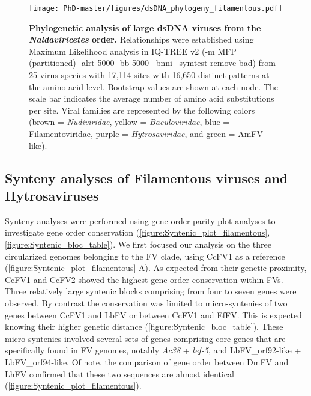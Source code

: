  \begin{figure}[H]
\texttt{[image: PhD-master/figures/dsDNA\_phylogeny\_filamentous.pdf]}\centering
\caption[Paper2:\textit{Naldaviricetes} phylogenetic tree]{\textbf{Phylogenetic analysis of large dsDNA viruses from the \textit{Naldaviricetes} order.} Relationships were established using Maximum Likelihood analysis in IQ-TREE v2 \citep{minh_iq-tree_2020} (-m MFP (partitioned) -alrt 5000 -bb 5000 –bnni –symtest-remove-bad) from 25 virus species with 17,114 sites with 16,650 distinct patterns at the amino-acid level. Bootstrap values are shown at each node. The scale bar indicates the average number of amino acid substitutions per site. Viral families are represented by the following colors (brown = \textit{Nudiviridae}, yellow = \textit{Baculoviridae}, blue = Filamentoviridae, purple = \textit{Hytrosaviridae}, and green = AmFV-like).}
\label{figure:dsDNA_phylogeny_filamentous}
\end{figure}


\subsection{Synteny analyses of Filamentous viruses and Hytrosaviruses}

Synteny analyses were performed using gene order parity plot analyses to investigate gene order conservation (\figurename{\ref{figure:Syntenic_plot_filamentous}}, \figurename{\ref{figure:Syntenic_bloc_table}}). We first focused our analysis on the three circularized genomes belonging to the FV clade, using CcFV1 as a reference (\figurename{\ref{figure:Syntenic_plot_filamentous}}-A). As expected from their genetic proximity, CcFV1 and CcFV2 showed the highest gene order conservation within FVs. Three relatively large syntenic blocks comprising from four to seven genes were observed. By contrast the conservation was limited to micro-syntenies of two genes between CcFV1 and LbFV or between CcFV1 and EfFV. This is expected knowing their higher genetic distance (\figurename{\ref{figure:Syntenic_bloc_table}}). These micro-syntenies involved several sets of genes comprising core genes that are specifically found in FV genomes, notably \textit{Ac38} + \textit{lef-5}, and LbFV\_orf92-like + LbFV\_orf94-like. Of note, the comparison of gene order between DmFV and LhFV confirmed that these two sequences are almost identical (\figurename{\ref{figure:Syntenic_plot_filamentous}}). 

